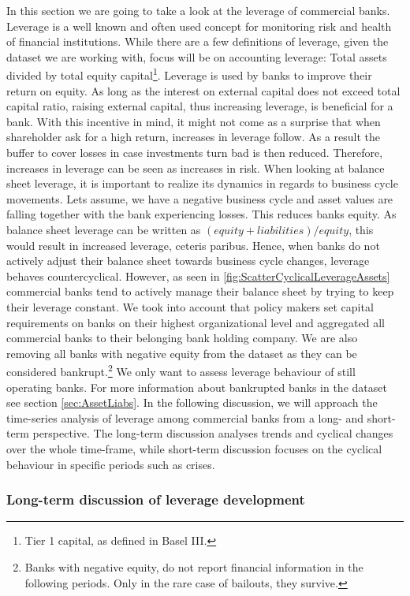 \documentclass[12pt, a4paper]{article} %
\begin{document}
In this section we are going to take a look at the leverage of commercial banks. Leverage is a well known and often used concept for monitoring risk and health of financial institutions. While there are a few definitions of leverage, given the dataset we are working with, focus will be on accounting leverage: Total assets divided by total equity capital\footnote{Tier 1 capital, as defined in Basel III.}. Leverage is used by banks to improve their return on equity. As long as the interest on external capital does not exceed total capital ratio, raising external capital, thus increasing leverage, is beneficial for a bank. With this incentive in mind, it might not come as a surprise that when shareholder ask for a high return, increases in leverage follow. As a result the buffer to cover losses in case investments turn bad is then reduced. Therefore, increases in leverage can be seen as increases in risk. 
When looking at balance sheet leverage, it is important to realize its dynamics in regards to business cycle movements. Lets assume, we have a negative business cycle and asset values are falling together with the bank experiencing losses. This reduces banks equity. As balance sheet leverage can be written as $(equity + liabilities)/equity$, this would result in increased leverage, ceteris paribus. Hence, when banks do not actively adjust their balance sheet towards business cycle changes, leverage behaves countercyclical. However, as seen in \ref{fig:ScatterCyclicalLeverageAssets} commercial banks tend to actively manage their balance sheet by trying to keep their leverage constant.  
We took into account that policy makers set capital requirements on banks on their highest organizational level and aggregated all commercial banks to their belonging bank holding company. 
We are also removing all banks with negative equity from the dataset as they can be considered bankrupt.\footnote{Banks with negative equity, do not report financial information in the following periods. Only in the rare case of bailouts, they survive.} We only want to assess leverage behaviour of still operating banks. For more information about bankrupted banks in the dataset see section \ref{sec:AssetLiabs}.
In the following discussion, we will approach the time-series analysis of leverage among commercial banks from a long- and short-term perspective. The long-term discussion analyses trends and cyclical changes  over the whole time-frame, while short-term discussion focuses on the cyclical behaviour in specific periods such as crises.

\subsubsection{Long-term discussion of leverage development}
\end{document}
